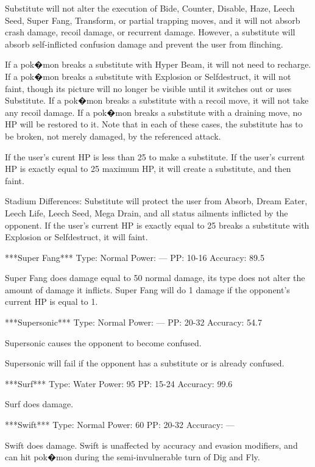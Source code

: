 \documentclass[reprint, aps, prl, paper=A4]{revtex4-1}
\begin{document}
Substitute will not alter the execution of Bide, Counter, Disable, Haze, Leech Seed, Super
Fang, Transform, or partial trapping moves, and it will not absorb crash damage, recoil damage,
or recurrent damage. However, a substitute will absorb self-inflicted confusion damage and
prevent the user from flinching.

If a pok�mon breaks a substitute with Hyper Beam, it will not need to recharge. If a pok�mon
breaks a substitute with Explosion or Selfdestruct, it will not faint, though its picture will
no longer be visible until it switches out or uses Substitute. If a pok�mon breaks a substitute
with a recoil move, it will not take any recoil damage. If a pok�mon breaks a substitute with a
draining move, no HP will be restored to it. Note that in each of these cases, the substitute
has to be broken, not merely damaged, by the referenced attack.

If the user's curent HP is less than 25%
to make a substitute. If the user's current HP is exactly equal to 25%
maximum HP, it will create a substitute, and then faint.

Stadium Differences:
Substitute will protect the user from Absorb, Dream Eater, Leech Life, Leech Seed, Mega Drain,
and all status ailments inflicted by the opponent. If the user's current HP is exactly equal to
25%
breaks a substitute with Explosion or Selfdestruct, it will faint.


***Super Fang***
Type: Normal
Power: ---
PP: 10-16
Accuracy: 89.5%

Super Fang does damage equal to 50%
normal damage, its type does not alter the amount of damage it inflicts. Super Fang will do 1
damage if the opponent's current HP is equal to 1.


***Supersonic***
Type: Normal
Power: ---
PP: 20-32
Accuracy: 54.7%

Supersonic causes the opponent to become confused.

Supersonic will fail if the opponent has a substitute or is already confused.


***Surf***
Type: Water
Power: 95
PP: 15-24
Accuracy: 99.6%

Surf does damage.


***Swift***
Type: Normal
Power: 60
PP: 20-32
Accuracy: ---

Swift does damage. Swift is unaffected by accuracy and evasion modifiers, and can hit pok�mon
during the semi-invulnerable turn of Dig and Fly.
\end{document}
